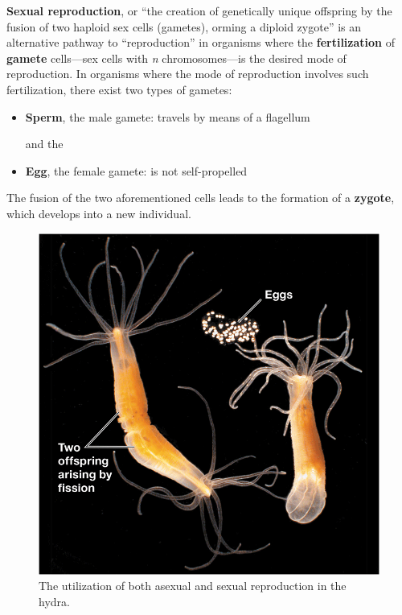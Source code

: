 \documentclass{article}
\begin{document}
\textbf{Sexual reproduction}, or ``the creation of genetically unique offspring
by the fusion of two haploid sex cells (gametes), orming a diploid zygote'' is
an alternative pathway to ``reproduction'' in organisms where the
\textbf{fertilization} of \textbf{gamete} cells---sex cells with \emph{n}
chromosomes---is the desired mode of reproduction.
In organisms where the mode of reproduction involves such fertilization, there
exist two types of gametes:

\begin{itemize}
	\item \textbf{Sperm}, the male gamete: travels by means of a flagellum

		and the

	\item \textbf{Egg}, the female gamete: is not self-propelled
\end{itemize}

The fusion of the two aforementioned cells leads to the formation of a
\textbf{zygote}, which develops into a new individual.

\begin{figure}
	\centering
	\includegraphics[width=\linewidth]{hermaphroditism.png}
	\caption{The utilization of both asexual and sexual reproduction in the hydra.}
\end{figure}
\end{document}
